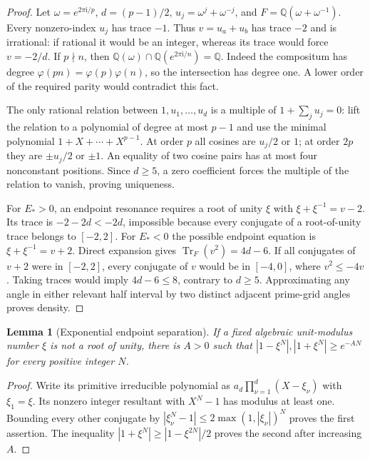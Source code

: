 \documentclass[11pt]{article}
\numberwithin{equation}{section}
\newtheorem{lemma}[theorem]{Lemma}
\theoremstyle{definition}
\newcommand{\ii}{\mathrm i}
\begin{document}
\begin{proof}
Let $\omega=e^{2\pi\ii/p}$, $d=(p-1)/2$,
$u_j=\omega^j+\omega^{-j}$, and
$F=\mathbb Q(\omega+\omega^{-1})$. Every nonzero-index $u_j$ has
trace $-1$. Thus $v=u_a+u_b$ has trace $-2$ and is irrational:
if rational it would be an integer, whereas its trace would force
$v=-2/d$. If $p\nmid n$, then
$\mathbb Q(\omega)\cap\mathbb Q(e^{2\pi\ii/n})=\mathbb Q$.
Indeed the compositum has degree
$\varphi(pn)=\varphi(p)\varphi(n)$, so the intersection has degree one.
A lower order of the required parity would contradict this fact.

The only rational relation between $1,u_1,\ldots,u_d$ is a multiple of
$1+\sum_j u_j=0$: lift the relation to a polynomial of degree at most
$p-1$ and use the minimal polynomial $1+X+\cdots+X^{p-1}$.
At order $p$ all cosines are $u_j/2$ or $1$; at order $2p$ they are
$\pm u_j/2$ or $\pm1$. An equality of two cosine pairs has at most four
nonconstant positions. Since $d\ge5$, a zero coefficient forces the
multiple of the relation to vanish, proving uniqueness.

For $E_*>0$, an endpoint resonance requires a root of unity $\xi$ with
$\xi+\xi^{-1}=v-2$. Its trace is $-2-2d<-2d$, impossible because
every conjugate of a root-of-unity trace belongs to $[-2,2]$.
For $E_*<0$ the possible endpoint equation is
$\xi+\xi^{-1}=v+2$. Direct expansion gives
$\operatorname{Tr}_F(v^2)=4d-6$. If all conjugates of $v+2$ were in
$[-2,2]$, every conjugate of $v$ would be in $[-4,0]$, where
$v^2\le-4v$. Taking traces would imply $4d-6\le8$, contrary to
$d\ge5$. Approximating any angle in either relevant half interval by
two distinct adjacent prime-grid angles proves density.
\end{proof}

\begin{lemma}[Exponential endpoint separation]\label{iso:separation}
If a fixed algebraic unit-modulus number $\xi$ is not a root of unity,
there is $A>0$ such that
$|1-\xi^N|,|1+\xi^N|\ge e^{-AN}$ for every positive integer $N$.
\end{lemma}
\begin{proof}
Write its primitive irreducible polynomial as
$a_d\prod_{\nu=1}^d(X-\xi_\nu)$ with $\xi_1=\xi$.
Its nonzero integer resultant with $X^N-1$ has modulus at least one.
Bounding every other conjugate by
$|\xi_\nu^N-1|\le2\max(1,|\xi_\nu|)^N$ proves the first assertion.
The inequality $|1+\xi^N|\ge |1-\xi^{2N}|/2$ proves the second after
increasing $A$.
\end{proof}
\end{document}
